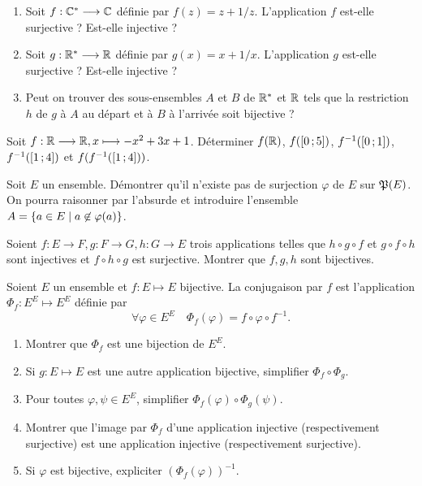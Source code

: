 \begin{exercice}
    \begin{enumerate}
        \item Soit \(f : \mathbb{C}^* \longrightarrow \mathbb{C}\) définie par \(f(z)=z+1/z\). L'application \(f\) est-elle surjective ? Est-elle injective ?
        \item Soit \(g : \mathbb{R}^* \longrightarrow \mathbb{R}\) définie par \(g(x)=x+1/x\). L'application \(g\) est-elle surjective ? Est-elle injective ?
        \item Peut on trouver des sous-ensembles \(A\) et \(B\) de \(\mathbb{R}^*\) et \(\mathbb{R}\) tels que la restriction \(h\) de \(g\) à \(A\) au départ et à \(B\) à l'arrivée soit bijective ?
    \end{enumerate}
\end{exercice}
\begin{exercice}
    Soit \(f:\mathbb{R} \longrightarrow \mathbb{R}, x \longmapsto -x^2+3x+1\). Déterminer \(f(\mathbb{R})\), \(f(\left[ 0 \, ;  5 \right])\), \(f^{-1}(\left[ 0 \, ;  1 \right])\), \(f^{-1}(\left[ 1 \, ;  4 \right])\) et \(f(f^{-1}(\left[ 1 \, ;  4 \right]))\).
\end{exercice}
\begin{exercice}
    Soit \(E\) un ensemble. Démontrer qu'il n'existe pas de surjection \(\varphi\) de \(E\) sur \(\mathfrak{P}(E)\). On pourra raisonner par l'absurde et introduire l'ensemble \(A=\left\{a \in E\mathrel{}\middle|\mathrel{}a \not\in \varphi(a)\right\}\).
\end{exercice}
\begin{exercice}
    Soient \(f : E \longrightarrow F, g : F \longrightarrow G, h : G \longrightarrow E\) trois applications telles que \(h \circ g \circ f\) et \(g \circ f \circ h\) sont injectives et \(f \circ h \circ g\) est surjective. Montrer que \(f, g, h\) sont bijectives.
\end{exercice}
\begin{exercice}[Conjugaison]
    Soient \(E\) un ensemble et \(f : E \longmapsto E\) bijective. La conjugaison par \(f\) est l'application \(\Phi_f : E^E \longmapsto E^E\) définie par
    \begin{equation}
        \forall \varphi \in E^E \quad \Phi_f(\varphi) = f \circ \varphi \circ f^{-1}.
    \end{equation}
    \begin{enumerate}
        \item Montrer que \(\Phi_f\) est une bijection de \(E^E\).
        \item Si \(g : E \longmapsto E\) est une autre application bijective, simplifier \(\Phi_f \circ \Phi_g\).
        \item Pour toutes \(\varphi, \psi \in E^E\), simplifier  \(\Phi_f(\varphi) \circ \Phi_g(\psi)\).
        \item Montrer que l'image par \(\Phi_f\) d'une application injective (respectivement surjective) est une application injective (respectivement surjective).
        \item Si \(\varphi\) est bijective, expliciter \((\Phi_f(\varphi))^{-1}\).
    \end{enumerate}
\end{exercice}
